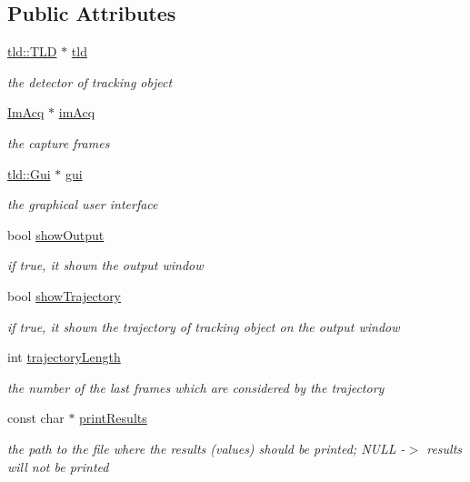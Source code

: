 \subsection*{Public Attributes}
\begin{DoxyCompactItemize}
\item 
\hyperlink{classtld_1_1TLD}{tld\-::\-T\-L\-D} $\ast$ \hyperlink{classMain_acd79fe4086a18124923606aabb982fec}{tld}
\begin{DoxyCompactList}\small\item\em the detector of tracking object \end{DoxyCompactList}\item 
\hyperlink{structImAcq}{Im\-Acq} $\ast$ \hyperlink{classMain_a37f97b28ea0f64421b5a0bb590059321}{im\-Acq}
\begin{DoxyCompactList}\small\item\em the capture frames \end{DoxyCompactList}\item 
\hyperlink{classtld_1_1Gui}{tld\-::\-Gui} $\ast$ \hyperlink{classMain_a56afdbd63fd6e0f92ed2113ad53cc8df}{gui}
\begin{DoxyCompactList}\small\item\em the graphical user interface \end{DoxyCompactList}\item 
bool \hyperlink{classMain_ae687ebbff0ebf899894316a3db89fdb5}{show\-Output}
\begin{DoxyCompactList}\small\item\em if true, it shown the output window \end{DoxyCompactList}\item 
bool \hyperlink{classMain_a1e3ed8eee4f7fe8633419512caa544c2}{show\-Trajectory}
\begin{DoxyCompactList}\small\item\em if true, it shown the trajectory of tracking object on the output window \end{DoxyCompactList}\item 
int \hyperlink{classMain_a9d46f95b41276d2beeb9b98db1267e98}{trajectory\-Length}
\begin{DoxyCompactList}\small\item\em the number of the last frames which are considered by the trajectory \end{DoxyCompactList}\item 
const char $\ast$ \hyperlink{classMain_af1797c9bbb3ff136bba623ced62b8454}{print\-Results}
\begin{DoxyCompactList}\small\item\em the path to the file where the results (values) should be printed; N\-U\-L\-L -\/$>$ results will not be printed \end{DoxyCompactList}\item 

\end{DoxyCompactItemize}

